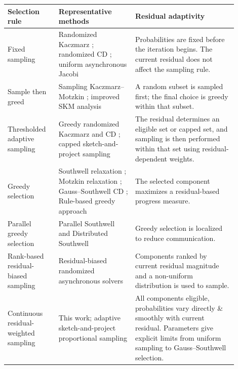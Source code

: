 \documentclass[pdflatex,sn-mathphys-num]{sn-jnl}%
\theoremstyle{thmstyleone}%
\theoremstyle{thmstyletwo}%
\theoremstyle{thmstylethree}%
\begin{document}
\begin{center}
\footnotesize
\renewcommand{\arraystretch}{1.50}
\begin{tabular}{@{}p{0.20\linewidth}p{0.3\linewidth}p{0.40\linewidth}@{}}
\toprule
\textbf{Selection rule} & \textbf{Representative methods} & \textbf{Residual adaptivity} \\
\midrule
Fixed sampling
&
Randomized Kaczmarz \cite{strohmer2009randomized};
randomized CD
\cite{leventhal2010randomized,nesterov2012efficiency};
uniform asynchronous Jacobi \cite{avron2015revisiting}
&
Probabilities are fixed before the iteration begins.
The current residual does not affect the sampling rule.
\\

Sample then greed
&
Sampling Kaczmarz--Motzkin
\cite{deloera2017sampling};
improved SKM analysis \cite{haddock2021greed}
&
A random subset is sampled first; the final choice is greedy within that subset.
\\

Thresholded adaptive sampling
&
Greedy randomized Kaczmarz and CD \cite{bai2018greedyk,bai2018relaxed,bai2019greedy};
capped sketch-and-project sampling \cite{gower2021adaptive}
&
The residual determines an eligible set or capped set, and sampling is then
performed within that set using residual-dependent weights.
\\

Greedy selection
&
Southwell relaxation \cite{southwell1946relaxation};
Motzkin relaxation \cite{agmon1954relaxation,motzkin1954relaxation};
Gauss--Southwell CD \cite{nutini2015coordinate};
Rule-based greedy approach \cite{griebel2012greedy,frommer2023convergence}
&
The selected component maximizes a residual-based progress measure.
\\

Parallel greedy selection
&
Parallel Southwell and Distributed Southwell
\cite{wolfsonpou2016reducing,wolfsonpou2017distributed}
&
Greedy selection is localized to reduce communication.
\\

Rank-based residual-biased sampling
&
Residual-biased randomized asynchronous solvers
\cite{coleman2019enhancing}
&
Components ranked by current residual magnitude and a non-uniform distribution is used to sample.
\\

Continuous residual-weighted sampling
&
This work; adaptive sketch-and-project proportional sampling
\cite{gower2021adaptive}
&
All components eligible, probabilities vary directly \& smoothly with current residual.  Parameters give explicit limits from uniform
sampling to Gauss--Southwell selection.
\\
\bottomrule
\end{tabular}
\end{center}
\end{document}
